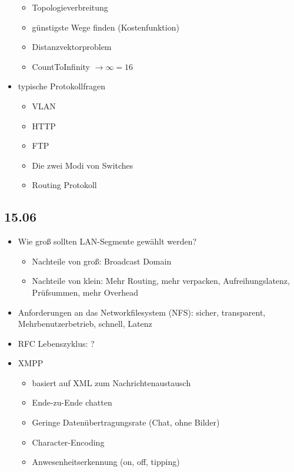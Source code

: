 \documentclass{article} %
\begin{document}
\begin{itemize}
\begin{itemize}
			\item Topologieverbreitung
			\item günstigste Wege finden (Kostenfunktion)
			\item Distanzvektorproblem
			\item CountToInfinity $\rightarrow \infty = 16$
		\end{itemize}
		\item typische Protokollfragen
		\begin{itemize}
			\item VLAN
			\item HTTP
			\item FTP
			\item Die zwei Modi von Switches
			\item Routing Protokoll
		\end{itemize}		
	\end{itemize}
	\subsection{15.06}
	\begin{itemize}
		\item Wie groß sollten LAN-Segmente gewählt werden?
		\begin{itemize}
			\item Nachteile von groß: Broadcast Domain
			\item Nachteile von klein: Mehr Routing, mehr verpacken, Aufreihungslatenz, Prüfsummen, mehr Overhead
		\end{itemize}
		\item Anforderungen an das Networkfilesystem (NFS): sicher, transparent, Mehrbenutzerbetrieb, schnell, Latenz
		\item RFC Lebenszyklus: ?
		\item XMPP
		\begin{itemize}
			\item basiert auf XML zum Nachrichtenaustausch
			\item Ende-zu-Ende chatten
			\item Geringe Datenübertragungsrate (Chat, ohne Bilder)
			\item Character-Encoding
			\item Anwesenheitserkennung (on, off, tipping)
		\end{itemize}
	\end{itemize}
\end{document}
